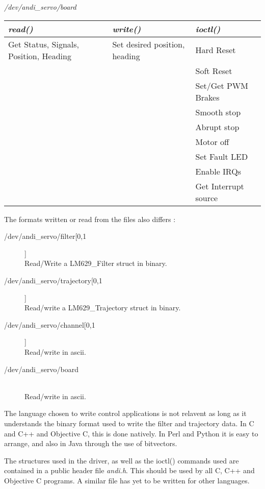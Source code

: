 \documentclass[a4paper,11pt]{article}
\begin{document}
\medskip
\textit{/dev/andi\_servo/board} 
\\
\tiny
\sffamily
\begin{tabular}{||l|l|l||}
\hline
\textit{read()} & \textit{write()} & \textit{ioctl()} \\
\hline
Get Status, Signals, Position, Heading & Set desired position, heading & Hard Reset \\
 & & Soft Reset \\
 & & Set/Get PWM Brakes \\
 & & Smooth stop \\
 & & Abrupt stop \\
 & & Motor off \\
 & & Set Fault LED \\
 & & Enable IRQs \\
 & & Get Interrupt source \\
\hline
\end{tabular}
\normalsize
\normalfont
\medskip

The formats written or read from the files also differs :
\small
\begin{description}
\item[/dev/andi\_servo/filter[0,1]] \\
Read/Write a LM629\_Filter struct in binary.
\item[/dev/andi\_servo/trajectory[0,1]] \\
Read/write a LM629\_Trajectory struct in binary.
\item[/dev/andi\_servo/channel[0,1]] \\
Read/write in ascii.
\item[/dev/andi\_servo/board] \\
Read/write in ascii.
\end{description}
\normalsize

The language chosen to write control applications is not relavent as
long as it understands the binary format used to write the filter and
trajectory data. In C and C++ and Objective C, this is done natively. In
Perl and Python it is easy to arrange, and also in Java through the use
of bitvectors. 

The structures used in the driver, as well as the ioctl() commands used
are contained in a public header file \textit{andi.h}. This should be
used by all C, C++ and Objective C programs. A similar file has yet to
be written for other languages.
\end{document}
